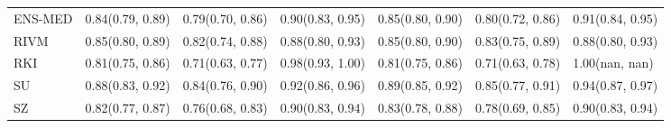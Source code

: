 \begin{tabular}{l p{} p{} p{} p{} p{} p{}}
ENS-MED & {0.84\newline(0.79, 0.89)} & {0.79\newline(0.70, 0.86)} & {0.90\newline(0.83, 0.95)} & {0.85\newline(0.80, 0.90)} & {0.80\newline(0.72, 0.86)} & {0.91\newline(0.84, 0.95)} \\
RIVM & {0.85\newline(0.80, 0.89)} & {0.82\newline(0.74, 0.88)} & {0.88\newline(0.80, 0.93)} & {0.85\newline(0.80, 0.90)} & {0.83\newline(0.75, 0.89)} & {0.88\newline(0.80, 0.93)} \\
RKI & {0.81\newline(0.75, 0.86)} & {0.71\newline(0.63, 0.77)} & {0.98\newline(0.93, 1.00)} & {0.81\newline(0.75, 0.86)} & {0.71\newline(0.63, 0.78)} & {1.00\newline(nan, nan)} \\
SU & {0.88\newline(0.83, 0.92)} & {0.84\newline(0.76, 0.90)} & {0.92\newline(0.86, 0.96)} & {0.89\newline(0.85, 0.92)} & {0.85\newline(0.77, 0.91)} & {0.94\newline(0.87, 0.97)} \\
SZ & {0.82\newline(0.77, 0.87)} & {0.76\newline(0.68, 0.83)} & {0.90\newline(0.83, 0.94)} & {0.83\newline(0.78, 0.88)} & {0.78\newline(0.69, 0.85)} & {0.90\newline(0.83, 0.94)} \\
\bottomrule
\end{tabular}
